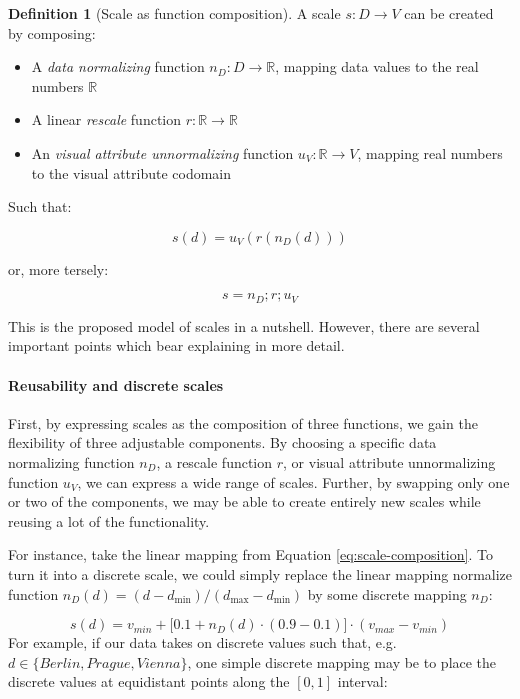 \documentclass[
  openany]{book}
\providecommand{\tightlist}{%
  \setlength{\itemsep}{0pt}\setlength{\parskip}{0pt}}
\theoremstyle{definition}
\newtheorem{definition}{Definition}[chapter]
\theoremstyle{definition}
\theoremstyle{definition}
\theoremstyle{definition}
\theoremstyle{remark}
\begin{document}
\begin{definition}[Scale as function composition]
\protect\hypertarget{def:scale}{}\label{def:scale}A scale \(s: D \to V\) can be created by composing:

\begin{itemize}
\tightlist
\item
  A \emph{data normalizing} function \(n_D: D \to \mathbb{R}\), mapping data values to the real numbers \(\mathbb{R}\)
\item
  A linear \emph{rescale} function \(r: \mathbb{R} \to \mathbb{R}\)
\item
  An \emph{visual attribute unnormalizing} function \(u_V: \mathbb{R} \to V\), mapping real numbers to the visual attribute codomain
\end{itemize}

Such that:

\[s(d) = u_V(r(n_D(d)))\]

or, more tersely:

\[s = n_D ;r ;u_V\]
\end{definition}

This is the proposed model of scales in a nutshell. However, there are several important points which bear explaining in more detail.

\paragraph{Reusability and discrete scales}\label{reusability-and-discrete-scales}

First, by expressing scales as the composition of three functions, we gain the flexibility of three adjustable components. By choosing a specific data normalizing function \(n_D\), a rescale function \(r\), or visual attribute unnormalizing function \(u_V\), we can express a wide range of scales. Further, by swapping only one or two of the components, we may be able to create entirely new scales while reusing a lot of the functionality.

For instance, take the linear mapping from Equation \eqref{eq:scale-composition}. To turn it into a discrete scale, we could simply replace the linear mapping normalize function \(n_D(d) = (d - d_{\min}) / (d_{\max} - d_{\min})\) by some discrete mapping \(n_D\):

\[s(d) = v_{min} + \bigg[ 0.1 + n_D(d) \cdot (0.9 - 0.1) \bigg] \cdot (v_{max} - v_{min})\]
For example, if our data takes on discrete values such that, e.g.~\(d \in \{ Berlin, Prague, Vienna \}\), one simple discrete mapping may be to place the discrete values at equidistant points along the \([0, 1]\) interval:
\end{document}
